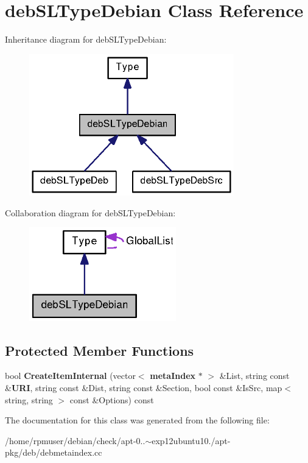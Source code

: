 \section{deb\-S\-L\-Type\-Debian \-Class \-Reference}
\label{classdebSLTypeDebian}


\-Inheritance diagram for deb\-S\-L\-Type\-Debian\-:
\nopagebreak
\begin{figure}[H]
\begin{center}
\leavevmode
\includegraphics[width=252pt]{classdebSLTypeDebian__inherit__graph}
\end{center}
\end{figure}


\-Collaboration diagram for deb\-S\-L\-Type\-Debian\-:
\nopagebreak
\begin{figure}[H]
\begin{center}
\leavevmode
\includegraphics[width=181pt]{classdebSLTypeDebian__coll__graph}
\end{center}
\end{figure}
\subsection*{\-Protected \-Member \-Functions}
\begin{DoxyCompactItemize}
\item 
bool {\bfseries \-Create\-Item\-Internal} (vector$<$ {\bf meta\-Index} $\ast$ $>$ \&\-List, string const \&{\bf \-U\-R\-I}, string const \&\-Dist, string const \&\-Section, bool const \&\-Is\-Src, map$<$ string, string $>$ const \&\-Options) const \label{classdebSLTypeDebian_a032bfe3610f3a9a2a4759350dbd9a4f3}

\end{DoxyCompactItemize}


\-The documentation for this class was generated from the following file\-:\begin{DoxyCompactItemize}
\item 
/home/rpmuser/debian/check/apt-\/0..$\sim$exp12ubuntu10./apt-\/pkg/deb/debmetaindex.\-cc\end{DoxyCompactItemize}
